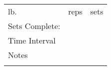 
{\setlength{\extrarowheight}{10pt}%
    \begin{tabularx}{\textwidth}{
      | >{\raggedleft\arraybackslash}X
      | >{\raggedleft\arraybackslash}X
      | >{\raggedleft\arraybackslash}X | }
        \hline
        \multicolumn{3}{|X|}{\VAR{name}} \\
        \hline
        lb. & reps &  sets \\
        \hline
        Sets Complete:& \multicolumn{2}{|X|}{ } \\
        \hline
        Time Interval & \multicolumn{2}{|X|}{ } \\
        \hline
        Notes & \multicolumn{2}{c|}{} \\
              & \multicolumn{2}{c|}{} \\
        \hline
    \end{tabularx}}

\vspace{0.25cm}

